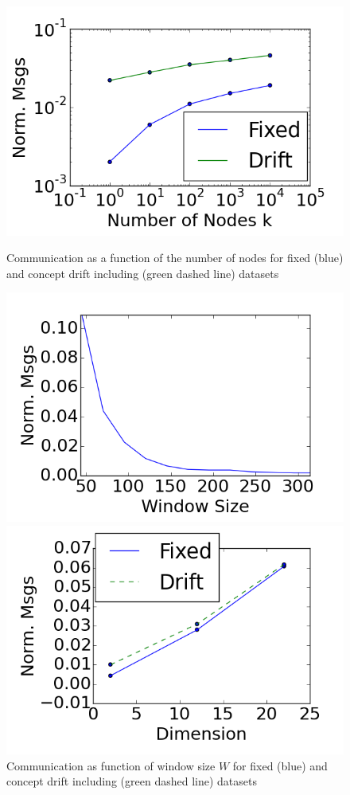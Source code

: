 \documentclass{vldb}
\begin{document}
\begin{figure}[!htb]
\centering
{}
    \centering
  \includegraphics[width=\linewidth]{CommunicationOfFixedVsDrift/Nodes.png}
  \caption{Communication as a function of the number of nodes for fixed (blue)
  and concept drift including (green dashed line) datasets}\label{Nodes}
  \endminipage\hfill
{}
    \centering
  \includegraphics[width=\linewidth]{CommunicationOfFixedVsDrift/WindowSize.png}
  \caption{Communication as function of window size $W$ for fixed (blue) and
  concept drift including (green  dashed line) datasets}\label{WindowSize}
  \endminipage\hfill
{}
    \centering
  \includegraphics[width=\linewidth]{CommunicationOfFixedVsDrift/Dimension.png}

\end{figure}
\end{document}
